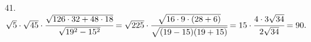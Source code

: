 41. $\sqrt{5}\cdot\sqrt{45}\cdot\cfrac{\sqrt{126\cdot32+48\cdot18}}{\sqrt{19^2-15^2}}=
\sqrt{225}\cdot\cfrac{\sqrt{16\cdot9\cdot(28+6)}}{\sqrt{(19-15)(19+15)}}=
15\cdot\cfrac{4\cdot3\sqrt{34}}{2\sqrt{34}}=90.$\\
